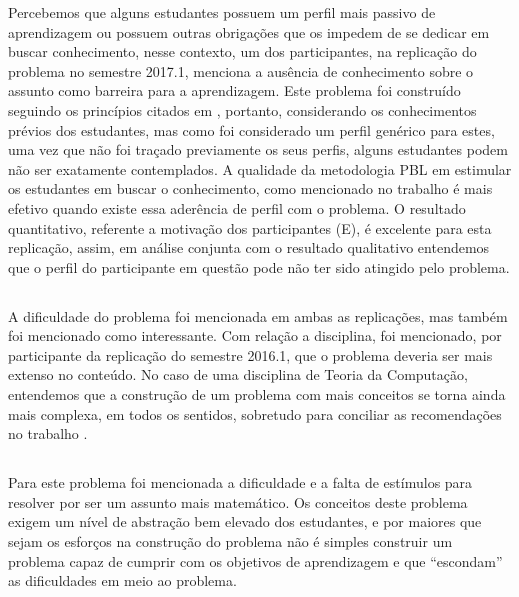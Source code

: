Percebemos que alguns estudantes possuem um perfil mais passivo
de aprendizagem ou possuem outras obrigações que os impedem
de se dedicar em buscar conhecimento, nesse contexto,
um dos participantes, na replicação do problema no
semestre 2017.1, menciona a ausência de conhecimento
sobre o assunto como barreira para a aprendizagem.
Este problema foi construído seguindo
os princípios citados em \cite{dolmans1997seven},
portanto, considerando os conhecimentos prévios
dos estudantes, mas como foi considerado um perfil
genérico para estes, uma vez que não foi
traçado previamente os seus perfis, alguns estudantes
podem não ser exatamente contemplados.
A qualidade da metodologia \ac{PBL} em estimular os estudantes
em buscar o conhecimento, como mencionado no trabalho
\cite{savery2015overview} é mais efetivo quando
existe essa aderência de perfil com o problema.
O resultado quantitativo, referente a motivação dos
participantes (E), é excelente para esta
replicação, assim, em análise conjunta com o
resultado qualitativo entendemos que o perfil
do participante em questão pode não ter sido
atingido pelo problema.

\subsection{\ProblemaE}

A dificuldade do problema foi mencionada em ambas as replicações, mas
também foi mencionado como interessante.
Com relação a disciplina, foi mencionado, por participante da
replicação do semestre 2016.1, que o problema deveria ser
mais extenso no conteúdo.
No caso de uma disciplina de Teoria da Computação, entendemos
que a construção de um problema com mais conceitos se
torna ainda mais complexa, em todos os sentidos, sobretudo
para conciliar as recomendações
no trabalho \cite{dolmans1997seven}.

\subsection{\ProblemaF}

Para este problema foi mencionada a dificuldade e a falta de estímulos
para resolver por ser um assunto mais matemático.
Os conceitos deste problema exigem um nível de abstração bem elevado
dos estudantes, e por maiores que sejam os esforços na construção
do problema não é simples construir um problema capaz de cumprir com
os objetivos de aprendizagem e que ``escondam'' as dificuldades
em meio ao problema.

